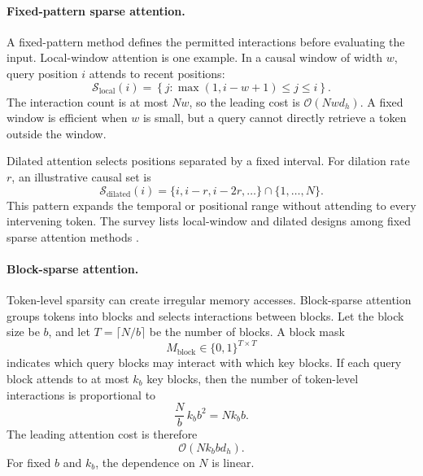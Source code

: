 \paragraph{Fixed-pattern sparse attention.}
A fixed-pattern method defines the permitted interactions before
evaluating the input. Local-window attention is one example. In a
causal window of width \(w\), query position \(i\) attends to recent
positions:
\begin{equation}
    \mathcal{S}_{\mathrm{local}}(i)
    =
    \left\{
        j:
        \max(1,i-w+1)\leq j\leq i
    \right\}.
    \label{eq:attn-local-window}
\end{equation}
The interaction count is at most \(Nw\), so the leading cost is
\(\mathcal{O}(Nwd_h)\). A fixed window is efficient when \(w\) is
small, but a query cannot directly retrieve a token outside the window.

Dilated attention selects positions separated by a fixed interval.
For dilation rate \(r\), an illustrative causal set is
\begin{equation}
    \mathcal{S}_{\mathrm{dilated}}(i)
    =
    \{i,i-r,i-2r,\ldots\}\cap\{1,\ldots,N\}.
    \label{eq:attn-dilated-pattern}
\end{equation}
This pattern expands the temporal or positional range without attending
to every intervening token. The survey lists local-window and dilated
designs among fixed sparse attention methods
\parencite{sun2026efficientattention}.

\paragraph{Block-sparse attention.}
Token-level sparsity can create irregular memory accesses. Block-sparse
attention groups tokens into blocks and selects interactions between
blocks. Let the block size be \(b\), and let
\(T=\lceil N/b\rceil\) be the number of blocks. A block mask
\begin{equation}
    M_{\mathrm{block}}\in\{0,1\}^{T\times T}
    \label{eq:attn-block-mask}
\end{equation}
indicates which query blocks may interact with which key blocks. If each
query block attends to at most \(k_b\) key blocks, then the number of
token-level interactions is proportional to
\[
    \frac{N}{b}\,k_b b^2
    =
    Nk_b b.
\]
The leading attention cost is therefore
\begin{equation}
    \mathcal{O}(Nk_bbd_h).
    \label{eq:attn-block-sparse-complexity}
\end{equation}
For fixed \(b\) and \(k_b\), the dependence on \(N\) is linear.


